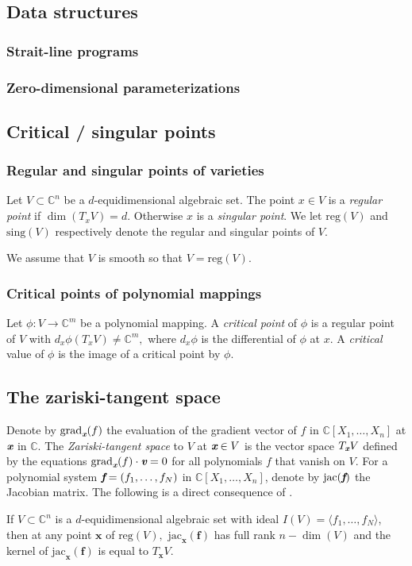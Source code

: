 \documentclass[sigconf]{acmart}
\def\xb{\textit{\textbf{x}}}
\def\C{\mathbb{C}}
\def\sing{ \textrm{sing}}
\def\jac{ \textrm{jac}}
\def\grad{\textrm{grad}}
\def\reg{\textrm{reg}}
\begin{document}
\subsection{Data structures}
%
\subsubsection{Strait-line programs}
%
\subsubsection{Zero-dimensional parameterizations}
%
\subsection{Critical / singular points}
%
\subsubsection{Regular and singular points of varieties}
%
Let $V \subset \C^n$ be a $d$-equidimensional algebraic set. 
The point $x \in V$ is a \textit{regular point} if $\dim (T_xV) = d.$ Otherwise $x$ is a \textit{singular point}. We let $\reg(V)$ and $\sing(V)$ respectively denote the regular and singular points of $V$. 
\par 
We assume that $V$ is smooth so that $V=\reg(V).$
%
\subsubsection{Critical points of polynomial mappings}
%
Let $\phi : V \rightarrow \C^m$ be a polynomial mapping. A \textit{critical point} of $\phi$ is a regular point of $V$ with $d_x \phi(T_xV) \not = \C^m,$ where $d_x \phi$ is the differential of $\phi$ at $x.$ A \textit{critical} value of $\phi$ is the image of a critical point by $\phi$.
%
\subsection{The zariski-tangent space}
%
Denote by $\grad_{\xb}(f)$ the evaluation of the gradient vector of $f$ in $\C[X_1,\hdots,X_n]$ at $\textit{\textbf{x}}$ in $\C$.
The \textit{Zariski-tangent space} to $V$ at $\textit{\textbf{x}} \in V$ is the vector space $T_{\xb}V$ defined by the equations $\grad_{\xb}(f) \cdot \textit{\textbf{v}}=0$ for all polynomials $f$ that vanish on $V$. For a polynomial system $\textit{\textbf{f}}=(f_1,\hdots,f_N)$ in $\C[X_1,\hdots,X_n]$, denote by $\jac(\textit{\textbf{f}})$ the Jacobian matrix.
The following is a direct consequence of \cite[Corollary 16.20]{ECA}.
%
\begin{proposition}
If $V \subset \C^n$ is a $d$-equidimensional algebraic set with ideal $I(V)=\langle f_1,\hdots,f_N \rangle$, then at any point $\textbf{x}$ of $\reg(V),$ $\jac_\textbf{x}(\textbf{f})$ has full rank $n - \dim(V)$ and the kernel of $\jac_\textbf{x}(\textbf{f})$ is equal to $T_\textbf{x}V.$ 
\end{proposition}
%
\end{document}
